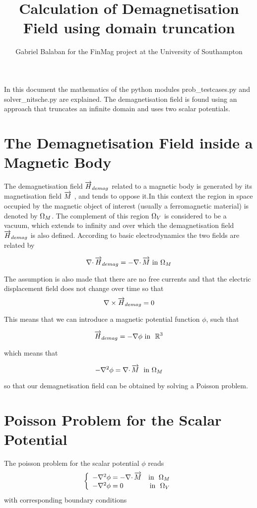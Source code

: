 \documentclass[12pt,a4paper,notitlepage]{article}
\title{Calculation of Demagnetisation Field using domain truncation}
\author{Gabriel Balaban for the FinMag project at the University of Southampton}
\begin{document}
\maketitle
\abstract{}
In this document the mathematics of the python modules prob\_testcases.py and solver\_nitsche.py are explained.
The demagnetisation field is found using an approach that truncates an infinite domain and uses two scalar potentials.

\newpage
\section{The Demagnetisation Field inside a Magnetic Body} 
The demagnetisation field $\overrightarrow{H}_{demag}$ related to a magnetic body is generated by its magnetisation field $\overrightarrow{M}$ ,
 and tends to oppose it.In this context the region in space occupied by the magnetic object of interest 
(usually a ferromagnetic material) is denoted by  $\Omega_M$.
The complement of this region $\Omega_V$ is considered to be a vacuum, which extends to infinity and over which
the demagnetisation field
$\overrightarrow{H}_{demag} $ is also defined.
According to basic electrodynamics the two fields are related by

\begin{equation}\label{dmagdef} \nabla \cdotp \overrightarrow{H}_{demag} = - \nabla \cdotp \overrightarrow{M} \  \mbox{in} \ \Omega_M \end{equation}

\noindent The assumption is also made that there are no free currents and that the electric displacement field does not change over time so that
\begin{equation}\label{nocurl}  \nabla \times \overrightarrow{H}_{demag} = 0\end{equation}

\noindent This means that we can introduce a magnetic potential function $\phi$, such that

\[ \dmag = - \nabla \phi \  \mbox{in} \ \ \mathbb{R}^3 \]

\noindent which means that 

\[ - \nabla^2 \phi = \nabla \cdotp \magn \ \ \mbox{in} \ \omM \]

\noindent so that our demagnetisation field can be obtained by solving a Poisson problem.

\section{Poisson Problem for the Scalar Potential}
The poisson problem for the scalar potential $\phi$ reads
\begin{equation}\label{phidef} 
\left\{
\begin{array}{lr}
- \nabla^2 \phi = - \nabla \cdotp \overrightarrow{M}  & \mbox{in } \ \Omega_M \\
- \nabla^2 \phi = 0 & \mbox{in } \ \Omega_V 
\end{array}
\right.
\end{equation}
\noindent with corresponding boundary conditions
\end{document}
